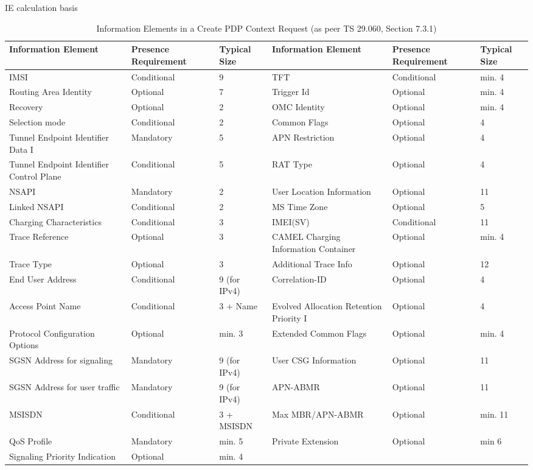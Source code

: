 \gls{IE} calculation basis
\begin{table}[htb]
\caption{Information Elements in a Create PDP Context Request (as peer TS 29.060, Section 7.3.1)}
\label{tab:createrequestelements}
\begin{tabular}{|p{4cm}|p{2cm}|p{2cm}|p{4cm}|p{2cm}|p{2cm}|} \hline
\textbf{Information Element} & \textbf{Presence Requirement} & \textbf{Typical Size} & \textbf{Information Element} & \textbf{Presence Requirement} & \textbf{Typical Size} \\ \hline
IMSI & Conditional & 9 & TFT & Conditional & min. 4\\ \hline
Routing Area Identity & Optional & 7 & Trigger Id & Optional & min. 4 \\ \hline
Recovery & Optional & 2 & OMC Identity & Optional & min. 4 \\ \hline
Selection mode	& Conditional & 2 & Common Flags & Optional & 4\\ \hline
Tunnel Endpoint Identifier Data I & Mandatory & 5 & APN Restriction & Optional & 4\\ \hline
Tunnel Endpoint Identifier Control Plane & Conditional & 5 & RAT Type & Optional & 4\\ \hline
\gls{NSAPI} & Mandatory & 2 & User Location Information & Optional & 11\\ \hline
Linked NSAPI & Conditional & 2 & MS Time Zone & Optional & 5\\ \hline
Charging Characteristics & Conditional & 3 & IMEI(SV) & Conditional & 11\\ \hline
Trace Reference & Optional & 3 & CAMEL Charging Information Container & Optional & min. 4\\ \hline
Trace Type & Optional & 3 & Additional Trace Info & Optional & 12\\ \hline
End User Address & Conditional & 9 (for IPv4) & Correlation-ID & Optional & 4\\ \hline
Access Point Name & Conditional & 3 + Name & Evolved Allocation Retention Priority I & Optional & 4\\ \hline
Protocol Configuration Options & Optional & min. 3 & Extended Common Flags & Optional & min. 4\\ \hline
SGSN Address for signaling & Mandatory  & 9 (for IPv4) & User CSG Information & Optional & 11 \\ \hline
SGSN Address for user traffic & Mandatory & 9 (for IPv4) & APN-ABMR & Optional  & 11 \\ \hline
MSISDN & Conditional & 3 + MSISDN & Max MBR/APN-ABMR & Optional & min. 11 \\ \hline
QoS Profile & Mandatory & min. 5 & Private Extension & Optional & min 6\\ \hline
Signaling Priority Indication & Optional & min. 4 & & & \\ \hline
\end{tabular}
\end{table}

